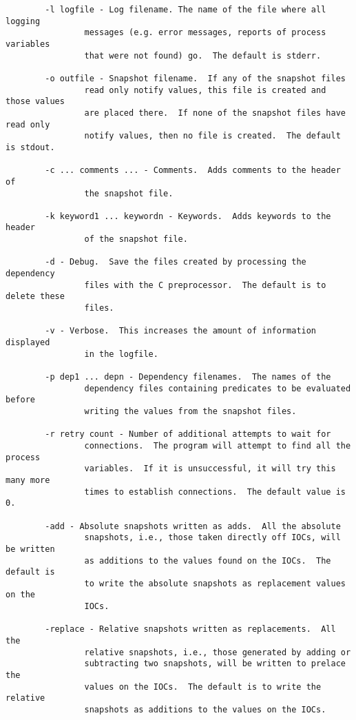 \begin{itemize}
\begin{verbatim}
        -l logfile - Log filename. The name of the file where all logging
                messages (e.g. error messages, reports of process variables
                that were not found) go.  The default is stderr.
 
        -o outfile - Snapshot filename.  If any of the snapshot files
                read only notify values, this file is created and those values
                are placed there.  If none of the snapshot files have read only
                notify values, then no file is created.  The default is stdout.
 
        -c ... comments ... - Comments.  Adds comments to the header of
                the snapshot file.
 
        -k keyword1 ... keywordn - Keywords.  Adds keywords to the header
                of the snapshot file.
 
        -d - Debug.  Save the files created by processing the dependency
                files with the C preprocessor.  The default is to delete these
                files.
 
        -v - Verbose.  This increases the amount of information displayed
                in the logfile.
 
        -p dep1 ... depn - Dependency filenames.  The names of the
                dependency files containing predicates to be evaluated before
                writing the values from the snapshot files.
 
        -r retry count - Number of additional attempts to wait for
                connections.  The program will attempt to find all the process
                variables.  If it is unsuccessful, it will try this many more
                times to establish connections.  The default value is 0.
 
        -add - Absolute snapshots written as adds.  All the absolute
                snapshots, i.e., those taken directly off IOCs, will be written
                as additions to the values found on the IOCs.  The default is
                to write the absolute snapshots as replacement values on the 
                IOCs.
 
        -replace - Relative snapshots written as replacements.  All the
                relative snapshots, i.e., those generated by adding or
                subtracting two snapshots, will be written to prelace the
                values on the IOCs.  The default is to write the relative
                snapshots as additions to the values on the IOCs.
 

\end{verbatim}
\end{itemize}

